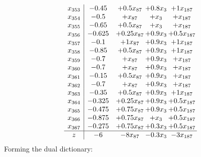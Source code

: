 \documentclass[11pt]{article}
\begin{document}
\[\begin{array}{c| c c@{\hskip 2pt} c@{\hskip 2pt} c@{\hskip 2pt} }
 x_{353}   &  -0.45 & + 0.5 x_{87} & + 0.8 x_{3} & + 1 x_{187}\\
 x_{354}   &  -0.5 & +  x_{87} & +  x_{3} & +  x_{187}\\
 x_{355}   &  -0.65 & + 0.5 x_{87} & +  x_{3} & +  x_{187}\\
 x_{356}   &  -0.625 & + 0.25 x_{87} & + 0.9 x_{3} & + 0.5 x_{187}\\
 x_{357}   &  -0.1 & + 1 x_{87} & + 0.9 x_{3} & + 1 x_{187}\\
 x_{358}   &  -0.85 & + 0.5 x_{87} & + 0.9 x_{3} & + 1 x_{187}\\
 x_{359}   &  -0.7 & +  x_{87} & + 0.9 x_{3} & +  x_{187}\\
 x_{360}   &  -0.7 & +  x_{87} & + 0.9 x_{3} & +  x_{187}\\
 x_{361}   &  -0.15 & + 0.5 x_{87} & + 0.9 x_{3} & +  x_{187}\\
 x_{362}   &  -0.7 & +  x_{87} & + 0.9 x_{3} & +  x_{187}\\
 x_{363}   &  -0.35 & + 0.5 x_{87} & + 0.9 x_{3} & + 1 x_{187}\\
 x_{364}   &  -0.325 & + 0.25 x_{87} & + 0.9 x_{3} & + 0.5 x_{187}\\
 x_{365}   &  -0.475 & + 0.75 x_{87} & + 0.9 x_{3} & + 0.5 x_{187}\\
 x_{366}   &  -0.875 & + 0.75 x_{87} & +  x_{3} & + 0.5 x_{187}\\
 x_{367}   &  -0.275 & + 0.75 x_{87} & + 0.3 x_{3} & + 0.5 x_{187}\\
\hline
z    &  -6 & -8 x_{87} & -0.3 x_{3} & -3 x_{187}\\
\end{array}\]
Forming the dual dictionary:
\end{document}
